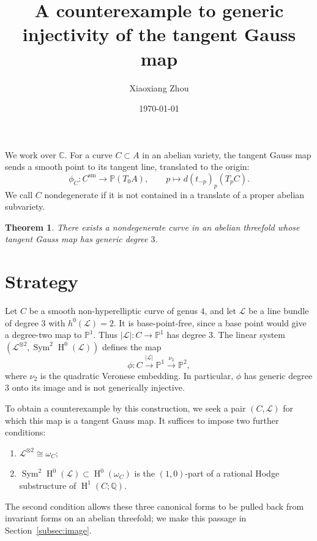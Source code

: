 \documentclass{amsart}
\title[The tangent Gauss map]{A counterexample to generic injectivity of the tangent Gauss map}
\author{Xiaoxiang Zhou}
\date{\today}
\newtheorem{theorem}{Theorem}
\DeclareMathOperator{\Sym}{Sym}
\DeclareMathOperator{\Hnm}{H}
\begin{document}
\maketitle

We work over $\mathbb{C}$. For a curve $C\subset A$ in an abelian variety,
the tangent Gauss map sends a smooth point to its tangent line, translated
to the origin:
\[
\phi_C:C^{\mathrm{sm}}\longrightarrow\mathbb{P}(T_0A),\qquad
p\longmapsto d(t_{-p})_p(T_pC).
\]
We call $C$ nondegenerate if it is not contained in a translate of a
proper abelian subvariety.

\begin{theorem}\label{thm:weak}
There exists a nondegenerate curve in an abelian threefold whose tangent
Gauss map has generic degree $3$.
\end{theorem}

\section{Strategy}

Let $C$ be a smooth non-hyperelliptic curve of genus $4$, and let
$\mathcal{L}$ be a line bundle of degree $3$ with $h^0(\mathcal{L})=2$.
It is base-point-free, since a base point would give a degree-two map to
$\mathbb{P}^1$.
Thus $|\mathcal{L}|:C\longrightarrow\mathbb{P}^1$ has degree $3$.
The linear system
$\left(\mathcal{L}^{\otimes2},\Sym^2\Hnm^0(\mathcal{L})\right)$
defines the map
\[
\phi:C\overset{|\mathcal{L}|}{\longrightarrow}\mathbb{P}^1
\overset{\nu_2}{\longrightarrow}\mathbb{P}^2,
\]
where $\nu_2$ is the quadratic Veronese embedding. In particular, $\phi$
has generic degree $3$ onto its image and is not generically injective.

To obtain a counterexample by this construction, we seek a pair
$(C,\mathcal{L})$ for which this map is a tangent Gauss map. It suffices
to impose two further conditions:
\begin{enumerate}
\item\label{cond:spin} $\mathcal{L}^{\otimes2}\cong\omega_C$;
\item\label{cond:hodge} $\Sym^2\Hnm^0(\mathcal{L})\subset\Hnm^0(\omega_C)$ is the
$(1,0)$-part of a rational Hodge substructure of
$\Hnm^1(C;\mathbb{Q})$.
\end{enumerate}
The second condition allows these three canonical forms to be pulled
back from invariant forms on an abelian threefold; we make this passage
in Section~\ref{subsec:image}.
\end{document}
